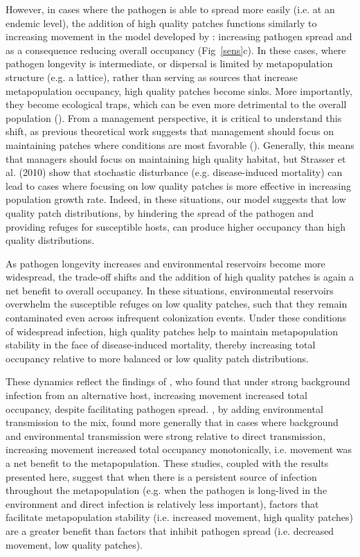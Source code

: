 \documentclass{svjour3}
\begin{document}
However, in cases where the pathogen is able to spread more easily (i.e. at an endemic level), the addition of high quality patches functions similarly to increasing movement in the model developed by \cite{Hess1996}: increasing pathogen spread and as a consequence reducing overall occupancy (Fig~\ref{sens}c).  In these cases, where pathogen longevity is intermediate, or dispersal is limited by metapopulation structure (e.g. a lattice), rather than serving as sources that increase metapopulation occupancy, high quality patches become sinks.  More importantly, they become ecological traps, which can be even more detrimental to the overall population (\cite{Kristan2003}).  From a management perspective, it is critical to understand this shift, as previous theoretical work suggests that management should focus on maintaining patches where conditions are most favorable (\cite{Strasser2010}).  Generally, this means that managers should focus on maintaining high quality habitat, but Strasser et al. (2010) show that stochastic disturbance (e.g. disease-induced mortality) can lead to cases where focusing on low quality patches is more effective in increasing population growth rate.  Indeed, in these situations, our model suggests that low quality patch distributions, by hindering the spread of the pathogen and providing refuges for susceptible hosts, can produce higher occupancy than high quality distributions.  

As pathogen longevity increases and environmental reservoirs become more widespread, the trade-off shifts and the addition of high quality patches is again a net benefit to overall occupancy.  In these situations, environmental reservoirs overwhelm the susceptible refuges on low quality patches, such that they remain contaminated even across infrequent colonization events.  Under these conditions of widespread infection, high quality patches help to maintain metapopulation stability in the face of disease-induced mortality, thereby increasing total occupancy relative to more balanced or low quality patch distributions.  

These dynamics reflect the findings of \cite{Gog2002}, who found that under strong background infection from an alternative host, increasing movement increased total occupancy, despite facilitating pathogen spread.  \cite{Park2012}, by adding environmental transmission to the mix, found more generally that in cases where background and environmental transmission were strong relative to direct transmission, increasing movement increased total occupancy monotonically, i.e. movement was a net benefit to the metapopulation.  These studies, coupled with the results presented here, suggest that when there is a persistent source of infection throughout the metapopulation (e.g. when the pathogen is long-lived in the environment and direct infection is relatively less important), factors that facilitate metapopulation stability (i.e. increased movement, high quality patches) are a greater benefit than factors that inhibit pathogen spread (i.e. decreased movement, low quality patches).   
\end{document}
